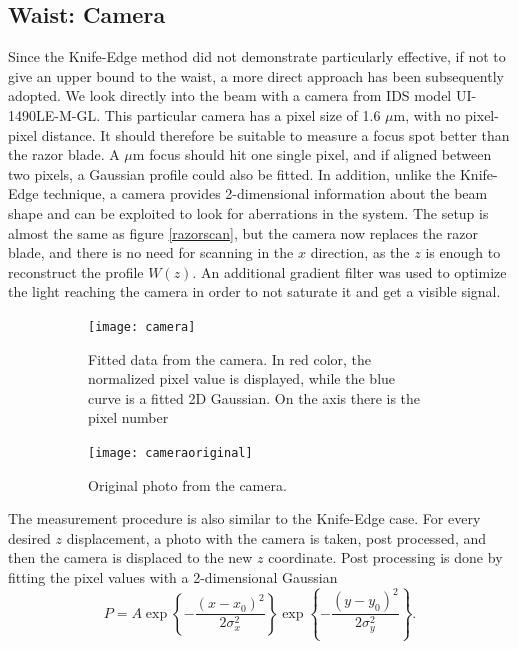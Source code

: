 \subsection{Waist: Camera}
\label{waistcamera}
Since the Knife-Edge method did not demonstrate particularly effective, if not to give an upper bound to the waist, a more direct approach has been subsequently adopted. We look directly into the beam with a camera from IDS model UI-1490LE-M-GL. This particular camera has a pixel size of 1.6 $\mu$m, with no pixel-pixel distance. It should therefore be suitable to measure a focus spot better than the razor blade. A $\mu$m focus should hit one single pixel, and if aligned between two pixels, a Gaussian profile could also be fitted.
In addition, unlike the Knife-Edge technique, a camera provides 2-dimensional information about the beam shape and can be exploited to look for aberrations in the system. The setup is almost the same as figure \ref{razorscan}, but the camera now replaces the razor blade, and there is no need for scanning in the $x$ direction, as the $z$ is enough to reconstruct the profile $W(z)$. An additional gradient filter was used to optimize the light reaching the camera in order to not saturate it and get a visible signal.
\begin{figure}
     \centering
     \begin{subfigure}[b]{0.67\textwidth}
         \centering
         \texttt{[image: camera]}
          \caption{Fitted data from the camera. In red color, the normalized pixel value is displayed, while the blue curve is a fitted 2D Gaussian. On the axis there is the pixel number}
     \end{subfigure}
     \hfill
     \begin{subfigure}[b]{0.3\textwidth}
         \centering
         \texttt{[image: cameraoriginal]}
        \vspace{5em}
         \caption{Original photo from the camera.}

     \end{subfigure}
        \caption{}
       \label{fig:camera}
\end{figure}
The measurement procedure is also similar to the Knife-Edge case. For every desired $z$ displacement, a photo with the camera is taken, post processed, and then the camera is displaced to the new $z$ coordinate. Post processing is done by fitting the pixel values with a 2-dimensional Gaussian
\begin{equation}
P = A \exp\left\{-\frac{(x-x_0)^2}{2\sigma_x^2}\right\} \exp\left\{-\frac{(y-y_0)^2}{2\sigma_y^2} \right\}.
\end{equation}
